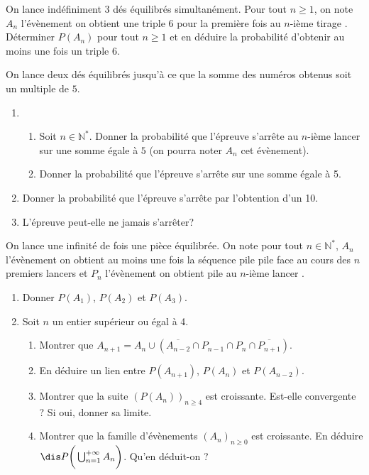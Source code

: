 \documentclass[a4paper,10pt]{report}
\begin{document}
\begin{Exercice}{} On lance indéfiniment 3 dés équilibrés simultanément. Pour tout $n \geq 1$, on note $A_n$ l'évènement \og on obtient une triple 6 pour la première fois au $n$-ième tirage \fg . Déterminer $P(A_n)$ pour tout $n \geq 1$ et en déduire la probabilité d'obtenir au moins une fois un triple $6$.
\end{Exercice}



\begin{Exercice}{} On lance deux dés équilibrés jusqu'à ce que la somme des numéros obtenus soit un multiple de $5$. 
\begin{enumerate}
\item 
\begin{enumerate}
\item Soit $n \in \mathbb{N}^*$.  Donner la probabilité que l'épreuve s'arrête au $n$-ième lancer sur une somme égale à $5$ (on pourra noter $A_n$ cet évènement).
\item Donner la probabilité que l'épreuve s'arrête sur une somme égale à 5.
\end{enumerate}
\item Donner la probabilité que l'épreuve s'arrête par l'obtention d'un 10.
\item L'épreuve peut-elle ne jamais s'arrêter?
\end{enumerate}
\end{Exercice}


\begin{Exercice}{} On lance une infinité de fois une pièce équilibrée. On note pour tout $n \in \mathbb{N}^*$, $A_n$ l'évènement \og on obtient au moins une fois la séquence pile pile face au cours des $n$ premiers lancers \fg et $P_n$  l'évènement \og on obtient pile au $n$-ième lancer \fg .

\begin{enumerate}
\item Donner $P(A_1)$, $P(A_2)$ et $P(A_3)$.
\item Soit $n$ un entier supérieur ou égal à 4.
\begin{enumerate}
\item Montrer que $A_{n+1} = A_n  \cup (\overline{A_{n-2}} \cap P_{n-1} \cap P_n \cap \overline{P_{n+1}})$.
\item En déduire un lien entre $P(A_{n+1})$, $P(A_n)$ et $P(A_{n-2})$. 
\item Montrer que la suite $(P(A_n))_{n \geq 4}$ est croissante. Est-elle convergente ? Si oui, donner sa limite.
\item Montrer que la famille d'évènements $(A_n)_{n \geq 0}$ est croissante. En déduire $\dis P \bigg{(} \bigcup_{n=1}^{+  \infty} A_n \bigg{)}$. Qu'en déduit-on ?
\end{enumerate}
\end{enumerate}
\end{Exercice}
\end{document}
